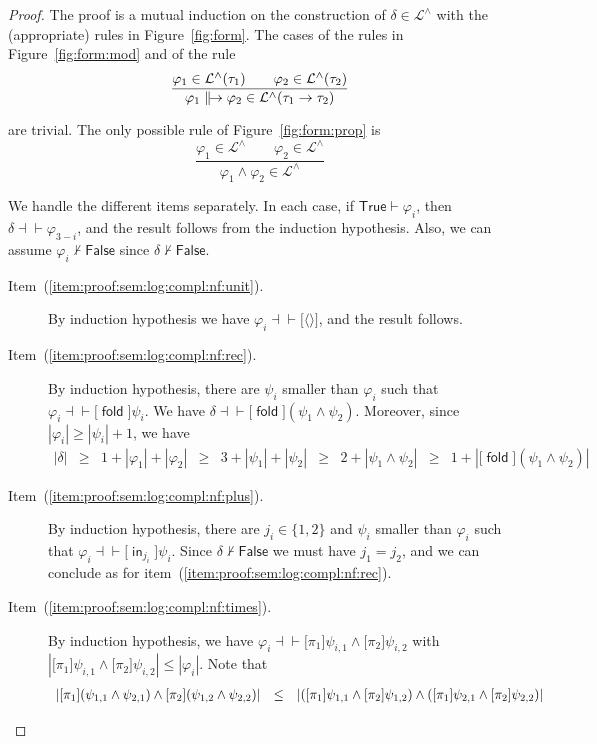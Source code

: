 \documentclass[%
  a4paper,
  UKenglish,
  cleveref,
  autoref,
  thm-restate,
  numberwithinsect,
]{lipics-v2021}
\newcommand\thesis{\vdash}
\newcommand\defthesisiff{\dashv\vdash}
\newcommand\thesisiff{\mathrel{\defthesisiff}}
\newcommand\pair[1]{{\langle #1\rangle}}
\newcommand\temp[1]{\mathsf{#1}}
\newcommand\True{\temp{True}}
\newcommand\False{\temp{False}}
\newcommand\term[1]{\mathsf{#1}}
\newcommand\inj{\mathop{\term{in}}}
\newcommand\fold{\mathop{\term{fold}}}
\newcommand\arrow\to
\newcommand\defrealto{\mathrel\parallel\joinrel\to}
\newcommand\realto{\mathrel{\defrealto}}
\newcommand\PT{\tau}		%
\newcommand\Lang{\mathcal{L}}
\newcommand\form[1]{\lbrack #1 \rbrack}
\begin{document}
\begin{proof}
The proof is a mutual induction on the construction of $\delta \in \Lang^\land$
with the (appropriate) rules in Figure~\ref{fig:form}.
The cases of the rules in Figure~\ref{fig:form:mod}
and of the rule
\[
\dfrac{\varphi_1 \in \Lang^\land(\PT_1)
  \qquad
  \varphi_2 \in \Lang^\land(\PT_2)}
  {\varphi_1 \realto \varphi_2 \in \Lang^\land(\PT_1 \arrow \PT_2)}
\]

\noindent
are trivial.
The only possible rule of
Figure~\ref{fig:form:prop}
is
\[
\dfrac{\varphi_1 \in \Lang^\land
  \qquad
  \varphi_2 \in \Lang^\land}
  {\varphi_1 \land \varphi_2 \in \Lang^\land}
\]

\noindent
We handle the different items separately.
In each case, if $\True \thesis \varphi_i$,
then $\delta \thesisiff \varphi_{3-i}$,
and the result follows from the induction hypothesis.
Also, we can assume $\varphi_i \not\thesis \False$
since $\delta \not\thesis \False$.
\begin{description}
\item[Item~(\ref{item:proof:sem:log:compl:nf:unit}).]
By induction hypothesis
we have $\varphi_i \thesisiff \form{\pair{}}$,
and the result follows.

\item[Item~(\ref{item:proof:sem:log:compl:nf:rec}).]
By induction hypothesis,
there are $\psi_i$ smaller than $\varphi_i$
such that
$\varphi_i \thesisiff \form{\fold}\psi_i$.
We have
$\delta \thesisiff \form{\fold}(\psi_1 \land \psi_2)$.
Moreover, since $|\varphi_i| \geq |\psi_i|+1$,
we have 
\[
\begin{array}{*{9}{l}}
  |\delta|
& \geq
& 1 + |\varphi_1| + |\varphi_2|
%
& \geq
& 3 + |\psi_1| + |\psi_2|
%
& \geq
& 2 + |\psi_1 \land \psi_2|
%
& \geq
& 1 + |\form{\fold}(\psi_1 \land \psi_2)|
\end{array}
\]

\item[Item~(\ref{item:proof:sem:log:compl:nf:plus}).]
By induction hypothesis,
there are $j_i \in \{1,2\}$
and $\psi_i$ smaller than $\varphi_i$
such that
$\varphi_i \thesisiff \form{\inj_{j_i}}\psi_i$.
Since $\delta \not\thesis \False$
we must have $j_1 = j_2$,
and
we can conclude as for item~(\ref{item:proof:sem:log:compl:nf:rec}).

\item[Item~(\ref{item:proof:sem:log:compl:nf:times}).]
By induction hypothesis,
we have
$\varphi_i \thesisiff \form{\pi_1}\psi_{i,1} \land \form{\pi_2}\psi_{i,2}$
with
$|\form{\pi_1}\psi_{i,1} \land \form{\pi_2}\psi_{i,2}| \leq |\varphi_i|$.
Note that
\[
\begin{array}{l l l}
  |\form{\pi_1}(\psi_{1,1} \land \psi_{2,1})
  \land \form{\pi_2}(\psi_{1,2} \land \psi_{2,2})|
& \leq
& 
  |(\form{\pi_1}\psi_{1,1} \land \form{\pi_2}\psi_{1,2})
   \land
   (\form{\pi_1}\psi_{2,1} \land \form{\pi_2}\psi_{2,2})|
\end{array}
\]


\end{description}
\end{proof}
\end{document}
